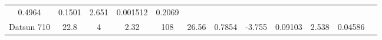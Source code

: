 \documentclass[]{article}
\theoremstyle{definition}
\theoremstyle{definition}
\theoremstyle{definition}
\theoremstyle{remark}
\begin{document}
\begin{longtable}[]{@{}cccccccccccc@{}}
\begin{minipage}[t]{0.05\columnwidth}
0.4964\strut
\end{minipage} & \begin{minipage}[t]{0.05\columnwidth}\centering\strut
0.1501\strut
\end{minipage} & \begin{minipage}[t]{0.05\columnwidth}\centering\strut
2.651\strut
\end{minipage} & \begin{minipage}[t]{0.06\columnwidth}\centering\strut
0.001512\strut
\end{minipage} & \begin{minipage}[t]{0.06\columnwidth}\centering\strut
0.2069\strut
\end{minipage}\tabularnewline
\begin{minipage}[t]{0.11\columnwidth}\centering\strut
Datsun 710\strut
\end{minipage} & \begin{minipage}[t]{0.04\columnwidth}\centering\strut
22.8\strut
\end{minipage} & \begin{minipage}[t]{0.08\columnwidth}\centering\strut
4\strut
\end{minipage} & \begin{minipage}[t]{0.04\columnwidth}\centering\strut
2.32\strut
\end{minipage} & \begin{minipage}[t]{0.04\columnwidth}\centering\strut
108\strut
\end{minipage} & \begin{minipage}[t]{0.05\columnwidth}\centering\strut
26.56\strut
\end{minipage} & \begin{minipage}[t]{0.05\columnwidth}\centering\strut
0.7854\strut
\end{minipage} & \begin{minipage}[t]{0.05\columnwidth}\centering\strut
-3.755\strut
\end{minipage} & \begin{minipage}[t]{0.05\columnwidth}\centering\strut
0.09103\strut
\end{minipage} & \begin{minipage}[t]{0.05\columnwidth}\centering\strut
2.538\strut
\end{minipage} & \begin{minipage}[t]{0.06\columnwidth}\centering\strut
0.04586\strut
\end{minipage} & \begin{minipage}[t]{0.06\columnwidth}\centering\strut

\end{minipage}
\end{longtable}
\end{document}

